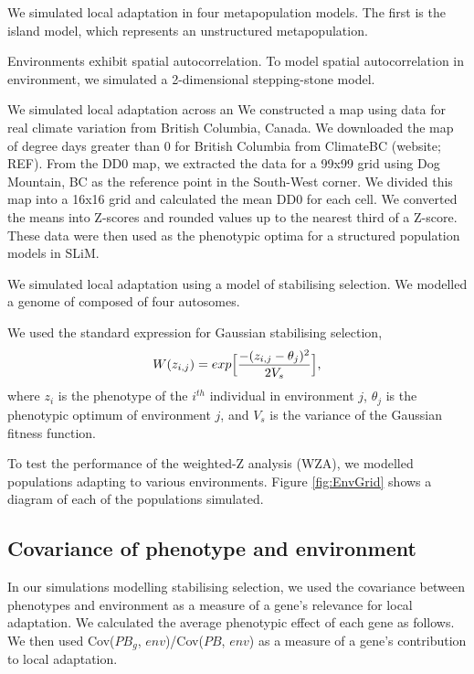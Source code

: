\documentclass[11pt,twoside,lineno]{GSA_format}
\begin{document}
We simulated local adaptation in four metapopulation models. The first is the island model, which represents an unstructured metapopulation. 

Environments exhibit spatial autocorrelation. To model spatial autocorrelation in environment, we simulated a 2-dimensional stepping-stone model. 

We simulated local adaptation across an 
We constructed a map using data for real climate variation from British Columbia, Canada. We downloaded the map of degree days greater than 0 for British Columbia from ClimateBC (website; REF). From the DD0 map, we extracted the data for a 99x99 grid using Dog Mountain, BC as the reference point in the South-West corner. We divided this map into a 16x16 grid and calculated the mean DD0 for each cell. We converted the means into Z-scores and rounded values up to the nearest third of a Z-score. These data were then used as the phenotypic optima for a structured population models in SLiM.

We simulated local adaptation using a model of stabilising selection. We modelled a genome of composed of four autosomes. 

We used the standard expression for Gaussian stabilising selection,
\begin{equation}
\notag
W(z_{i,j}) = exp \Big[\frac{-(z_{i,j} - \theta_j)^2}{2V_s}\Big],
\end{equation}
where $z_i$ is the phenotype of the $i^{th}$ individual in environment $j$, $\theta_j$ is the phenotypic optimum of environment $j$, and $V_s$ is the variance of the Gaussian fitness function. 

To test the performance of the weighted-Z analysis (WZA), we modelled populations adapting to various environments. Figure \ref{fig:EnvGrid} shows a diagram of each of the populations simulated.


\subsection{Covariance of phenotype and environment} 

In our simulations modelling stabilising selection, we used the covariance between phenotypes and environment as a measure of a gene's relevance for local adaptation. We calculated the average phenotypic effect of each gene as follows.
We then used Cov($PB_g$, $env$)/Cov($PB$, $env$) as a measure of a gene's contribution to local adaptation.
\end{document}
